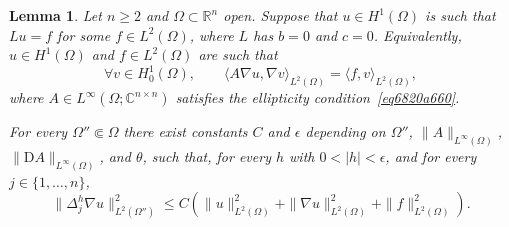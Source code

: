 \documentclass[a4paper,9pt]{amsart}
\newcommand{\R}{\mathbb{R}}	%
\newcommand{\C}{\mathbb{C}}	%
\newcommand{\Diff}{\mathrm{D}}
\newcommand{\grad}{\nabla}
\theoremstyle{plain}
\newtheorem{lemma}[proposition]{Lemma}
\theoremstyle{definition}
\theoremstyle{remark}
\begin{document}
\begin{lemma}\label{lem6823059f}
	Let $n\ge2$ and $\Omega\subset\R^n$ open.
	Suppose that $u\in H^1(\Omega)$ is such that $Lu=f$ for some $f\in L^2(\Omega)$, where $L$ has $b=0$ and $c=0$.
	Equivalently, $u\in H^1(\Omega)$ and $f\in L^2(\Omega)$ are such that
	\begin{equation}\label{eq682306a7}
		\forall v\in H^1_0(\Omega),\qquad
		\langle A\grad u,\grad v \rangle_{L^2(\Omega)} = \langle f,v \rangle_{L^2(\Omega)} ,
	\end{equation}
	where $A\in L^\infty(\Omega;\C^{n\times n})$ satisfies the ellipticity condition~\eqref{eq6820a660}.
	
	
	For every $\Omega''\Subset\Omega$ there exist constants $C$ and $\epsilon$ depending on $\Omega''$, $\| A\|_{L^\infty(\Omega)}$, $\|\Diff A\|_{L^\infty(\Omega)}$, and $\theta$, such that,
	for every $h$ with $0<|h|<\epsilon$, and for every $j\in\{1,\dots,n\}$,
	\begin{equation}\label{eq68231837}
		\|\Delta_j^{h}\grad u\|_{L^2(\Omega'')}^2 \le C ( \|u\|_{L^2(\Omega)}^2 + \| \grad u\|_{L^2(\Omega)}^2 + \|f\|_{L^2(\Omega)}^2 ) .
	\end{equation}
\end{lemma}
\end{document}
